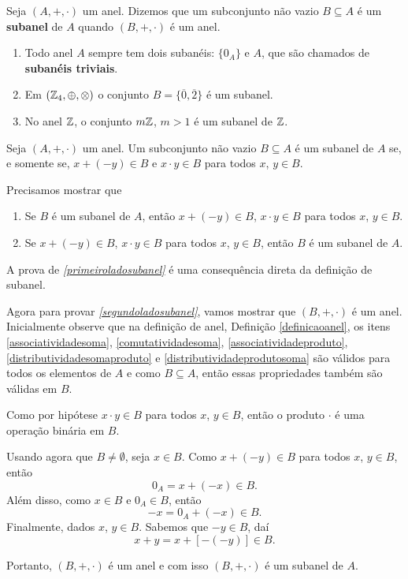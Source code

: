 \begin{definicao}
    Seja $(A, +, \cdot)$ um anel. Dizemos que um subconjunto não vazio $B\subseteq A$ é um \textbf{subanel} de $A$ quando $(B, +, \cdot)$ é um anel.
\end{definicao}

\begin{exemplos}
    \begin{enumerate}[label={\arabic*})]
        \item Todo anel $A$ sempre tem dois subanéis: $\{0_{A}\}$ e $A$, que são chamados de \textbf{subanéis triviais}.
        \item Em $(\mathbb{Z}_4,\oplus,\otimes)$ o conjunto $B = \{\overline{0}, \overline{2}\}$ é um subanel.
        \item No anel $\mathbb{Z}$, o conjunto $m\mathbb{Z}$, $m > 1$ é um subanel de $\mathbb{Z}$.
    \end{enumerate}
\end{exemplos}

\begin{proposicao}\label{proposicao_subanel}
    Seja $(A, +,\cdot)$ um anel. Um subconjunto não vazio $B\subseteq A$ é um subanel de $A$ se, e somente se, $x + (-y) \in B$ e $x\cdot y \in B$ para todos $x$, $y \in
    B$.
\end{proposicao}
\begin{prova}
    Precisamos mostrar que
    \begin{enumerate}[label={\roman*})]
        \item Se $B$ é um subanel de $A$, então $x + (-y) \in B$, $x\cdot y \in B$ para todos $x$, $y \in B$.\label{primeiroladosubanel}

        \item Se $x + (-y) \in B$, $x\cdot y \in B$ para todos $x$, $y \in B$, então $B$ é um subanel de $A$.\label{segundoladosubanel}
    \end{enumerate}

    A prova de \textit{\ref{primeiroladosubanel}} é uma consequência direta da definição de subanel.

    Agora para provar \textit{\ref{segundoladosubanel}}, vamos mostrar que $(B, +, \cdot)$ é um anel. Inicialmente observe que na definição de anel, Definição
    \ref{definicaoanel}, os itens \ref{associatividadesoma}, \ref{comutatividadesoma}, \ref{associatividadeproduto}, \ref{distributividadesomaproduto} e
    \ref{distributividadeprodutosoma} são válidos para todos os elementos de $A$ e como $B \subseteq A$, então essas propriedades também são válidas em $B$.

    Como por hipótese $x\cdot y \in B$ para todos $x$, $y \in B$, então o produto $\cdot$ é uma operação binária em $B$.

    Usando agora que $B \ne \emptyset$, seja $x \in B$. Como $x + (-y) \in B$ para todos $x$, $y \in B$, então
    \[
        0_A = x + (-x) \in B.
    \]
    Além disso, como $x \in B$ e $0_A \in B$, então
    \[
        -x = 0_A + (-x) \in B.
    \]
    Finalmente, dados $x$, $y \in B$. Sabemos que $-y \in B$, daí
    \[
        x + y = x + [-(-y)] \in B.
    \]

    Portanto, $(B, +, \cdot)$ é um anel e com isso $(B, +, \cdot)$ é um subanel de $A$.
\end{prova}

